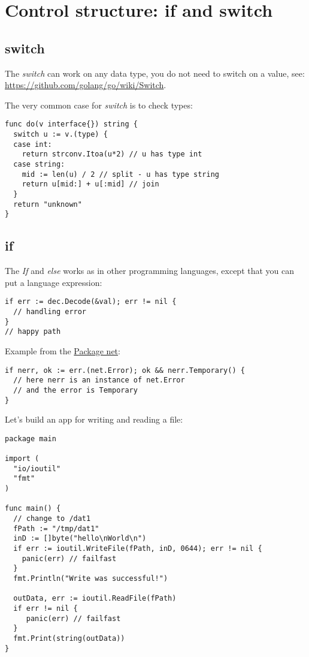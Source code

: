 \documentclass[11pt, letterpaper]{article}
\begin{document}
\section{Control structure: if and switch}

\subsection{switch}

The \emph{switch} can work on any data type, you do not need to switch on a value, see: \href{Golang Wiki}{https://github.com/golang/go/wiki/Switch}.

The very common case for \emph{switch} is to check types:

\begin{verbatim}
func do(v interface{}) string {
  switch u := v.(type) {
  case int:
    return strconv.Itoa(u*2) // u has type int
  case string:
    mid := len(u) / 2 // split - u has type string
    return u[mid:] + u[:mid] // join
  }
  return "unknown"
}
\end{verbatim}

\subsection{if}

The \emph{If} and \emph{else} works as in other programming languages, except that you can put a language expression:

\begin{verbatim}
if err := dec.Decode(&val); err != nil {
  // handling error
}
// happy path
\end{verbatim}

Example from the \href{https://golang.org/src/net/net.go}{Package net}:

\begin{verbatim}
if nerr, ok := err.(net.Error); ok && nerr.Temporary() {
  // here nerr is an instance of net.Error
  // and the error is Temporary
}
\end{verbatim}

Let's build an app for writing and reading a file:

\begin{verbatim}
package main

import (
  "io/ioutil"
  "fmt"
)

func main() {
  // change to /dat1
  fPath := "/tmp/dat1"
  inD := []byte("hello\nWorld\n")
  if err := ioutil.WriteFile(fPath, inD, 0644); err != nil {
    panic(err) // failfast
  }
  fmt.Println("Write was successful!")

  outData, err := ioutil.ReadFile(fPath)
  if err != nil {
     panic(err) // failfast
  }
  fmt.Print(string(outData))
}
\end{verbatim}
\end{document}
